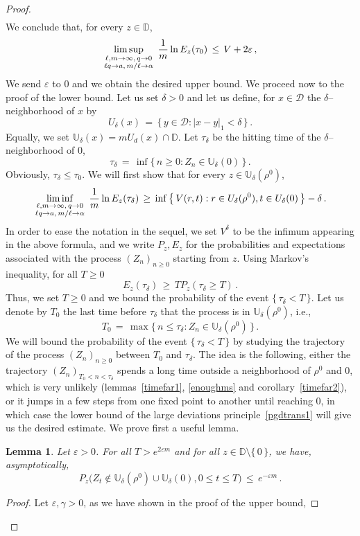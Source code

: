 \documentclass[a4paper,12pt]{article}
\newtheorem{lemma}[theorem]{Lemma}
\theoremstyle{definition}
\theoremstyle{remark}
\def \cD {\mathcal{D}}
\def \a {\alpha}
\def \g {\gamma}
\def \d {\delta}
\def \e {\varepsilon}
\def \dD {\mathbb{D}}
\def \dU {\mathbb{U}}
\def \Zt {(Z_n)_{n\geq 0}}
\begin{document}
\begin{proof}
\begin{multline*}
\end{multline*}
We conclude that, for every $z\in\dD$,
$$\limsup_{\genfrac{}{}{0pt}{1}{\ell,m\to\infty,\,q\to 0}{\ell q \to a,\,m/\ell\to\a}}\,\frac{1}{m}\ln E_z(
\tau_0)\,\leq\,V+2\e\,,$$
We send $\e$ to 0 and we obtain the desired
upper bound.
We proceed now to the proof of the lower bound.
Let us set $\d>0$ and let us define,
for $x\in\cD$ the $\d$--neighborhood of $x$ by 
$$U_\d(x)\,=\,\big\lbrace\,
y\in\cD:|x-y|_1<\d
\,\big\rbrace\,.$$
Equally,
we set 
$\dU_\d(x)=mU_d(x)\cap \dD$.
Let $\tau_\d$ be the hitting time of
the $\d$--neighborhood of $0$,
$$\tau_\d\,=\,\inf\big\lbrace\,
n\geq 0:Z_n\in\dU_\d(0)
\,\big\rbrace\,.$$
Obviously, $\tau_\d\leq \tau_0$.
We will first show that 
for every $z\in\dU_\d(\rho^0)$,
$$\liminf_{\genfrac{}{}{0pt}{1}{\ell,m\to\infty,\,q\to0}{\ell q\to a,\,m/\ell\to\a}}\,\frac{1}{m}\ln E_z(\tau_\d)
\,\geq\,\inf\big\lbrace\,
V(r,t):r\in U_\d(\rho^0),t\in U_\d(0)
\,\big\rbrace-\d\,.$$
In order to ease the notation in the sequel,
we set $V^\d$ to be the infimum appearing in the above formula, and we write $P_z,E_z$
for the probabilities and expectations associated with the process $(Z_n)_{n\geq0}$
starting from $z$.
Using Markov's inequality,
for all $T\geq 0$
$$E_z(\tau_\d)\,\geq\,
TP_z(\tau_\d\geq T)\,.$$
Thus, we set $T\geq 0$ and we bound
the probability of the event $\lbrace\,\tau_\d<T\,\rbrace$.
Let us denote by $T_0$ the last time before $\tau_\d$ 
that the process is in $\dU_\d(\rho^0)$, i.e.,
$$T_0\,=\,\max\big\lbrace\,
n\leq \tau_\d:Z_n\in\dU_\d(\rho^0)
\,\big\rbrace\,.$$
We will bound the probability of the event $\lbrace\,\tau_\d<T\,\rbrace$
by studying the trajectory of the process $\Zt$ between $T_0$ and $\tau_\d$.
The idea is the following,
either the trajectory $(Z_n)_{T_0<n<\tau_\d}$
spends a long time outside a neighborhood of $\rho^0$ and $0$,
which is very unlikely (lemmas~\ref{timefar1}, \ref{enoughms} and corollary~\ref{timefar2}),
or it jumps in a few steps from one fixed point to another until reaching 0,
in which case the lower bound of the large deviations principle~\ref{pgdtrans1}
will give us the desired estimate.
We prove first a useful lemma.
\begin{lemma}\label{timefar0rho}
Let $\e>0$. For all $T>e^{2\e m}$
and for all $z\in\dD\setminus\lbrace\,0\,\rbrace$,
we have, asymptotically,
$$P_z\big(
Z_t\not\in\dU_\d(\rho^0)\cup\dU_\d(0),0\leq t\leq T
\big)\,\leq\,e^{-\e m}\,.$$
\end{lemma}
\begin{proof}
Let $\e,\g>0$,
as we have shown in the proof of the upper bound,

\end{proof}
\end{proof}
\end{document}
